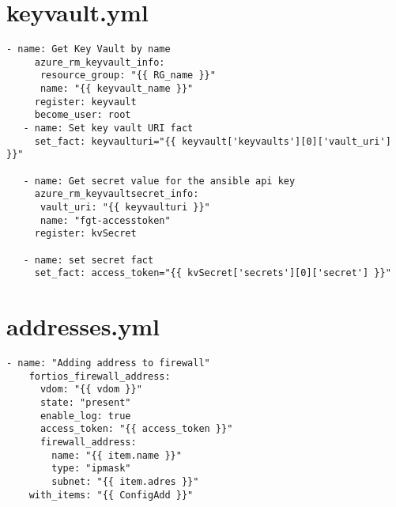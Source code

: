 \documentclass[dutch,dit,thesis]{hogentreport}
\begin{document}
\section{keyvault.yml}
\label{code:keyvault.yml}
\begin{lstlisting}[caption={keyvault.yml}]
   - name: Get Key Vault by name
     azure_rm_keyvault_info:
      resource_group: "{{ RG_name }}"
      name: "{{ keyvault_name }}"
     register: keyvault
     become_user: root
   - name: Set key vault URI fact
     set_fact: keyvaulturi="{{ keyvault['keyvaults'][0]['vault_uri'] }}"

   - name: Get secret value for the ansible api key
     azure_rm_keyvaultsecret_info:
      vault_uri: "{{ keyvaulturi }}"
      name: "fgt-accesstoken"
     register: kvSecret
   
   - name: set secret fact
     set_fact: access_token="{{ kvSecret['secrets'][0]['secret'] }}"
\end{lstlisting}

\section{addresses.yml}
\label{code:addresses.yml}

\begin{lstlisting}[caption={addresses.yml}]
  - name: "Adding address to firewall"
    fortios_firewall_address:
      vdom: "{{ vdom }}" 
      state: "present"
      enable_log: true
      access_token: "{{ access_token }}"
      firewall_address:
        name: "{{ item.name }}"
        type: "ipmask"
        subnet: "{{ item.adres }}" 
    with_items: "{{ ConfigAdd }}"

\end{lstlisting}
\end{document}

